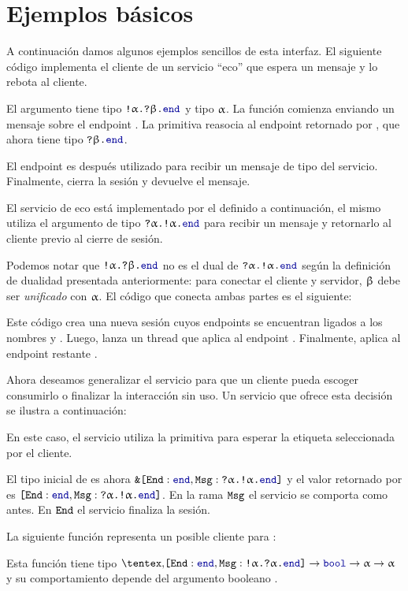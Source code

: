 \section{Ejemplos básicos}

A continuación damos algunos ejemplos sencillos de esta interfaz. El siguiente
código implementa el cliente de un servicio ``eco'' que espera un mensaje y
lo rebota al cliente.

\SimpleEchoClient

El argumento  tiene tipo $\Out\tvarA\In\tvarB\End$ y  tipo
$\tvarA$. La función  comienza enviando un mensaje  sobre
el endpoint . La primitiva  reasocia  al endpoint
retornado por , que ahora tiene tipo $\In\tvarB\End$.

El endpoint es después utilizado para recibir un mensaje de tipo  del
servicio. Finalmente,  cierra la sesión y devuelve el mensaje.

El servicio de eco está implementado por el  definido a
continuación, el mismo utiliza el argumento  de tipo
$\In\tvarA\Out\tvarA\End$ para recibir un mensaje  y retornarlo al
cliente previo al cierre de sesión.

\SimpleEchoService

Podemos notar que $\Out\tvarA\In\tvarB\End$ no es el dual de
$\In\tvar\Out\tvar\End$ según la definición de dualidad presentada
anteriormente: para conectar el cliente y servidor, $\tvarB$ debe ser
\emph{unificado} con $\tvarA$. El código que conecta ambas partes es el
siguiente:

\SimpleEchoMain

Este código crea una nueva sesión cuyos endpoints se encuentran ligados a los
nombres  y . Luego, lanza un thread que aplica  al
endpoint . Finalmente, aplica  al endpoint restante
.

Ahora deseamos generalizar el servicio para que un cliente pueda escoger
consumirlo o finalizar la interacción sin uso. Un servicio que ofrece esta
decisión se ilustra a continuación:

\OptionalEchoService

En este caso, el servicio utiliza la primitiva  para esperar la
etiqueta seleccionada por el cliente.

El tipo inicial de  es ahora $\Branch\set{\Tag[End] : \End, \Tag[Msg]
:\In\tvarA\Out\tvar\End}$ y el valor retornado por  es
$\set{\Tag[End] : \End, \Tag[Msg] :\In\tvarA\Out\tvar\End}$. En la rama
$\Tag[Msg]$ el servicio se comporta como antes. En $\Tag[End]$ el servicio
finaliza la sesión.

La siguiente función representa un posible cliente para :

\OptionalEchoClient

Esta función tiene tipo $\Choice\set{\Tag[End] : \End, \Tag[Msg] :
\Out\tvar\In\tvar\End} \to \tbool \to \tvar \to \tvar$ y su comportamiento depende del argumento booleano .
